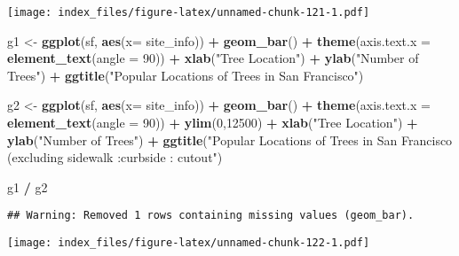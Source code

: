 \documentclass[
]{article}
\newenvironment{Shaded}{\begin{snugshade}}{\end{snugshade}}
\newcommand{\DataTypeTok}[1]{\textcolor[rgb]{0.13,0.29,0.53}{#1}}
\newcommand{\DecValTok}[1]{\textcolor[rgb]{0.00,0.00,0.81}{#1}}
\newcommand{\KeywordTok}[1]{\textcolor[rgb]{0.13,0.29,0.53}{\textbf{#1}}}
\newcommand{\NormalTok}[1]{#1}
\newcommand{\OperatorTok}[1]{\textcolor[rgb]{0.81,0.36,0.00}{\textbf{#1}}}
\newcommand{\StringTok}[1]{\textcolor[rgb]{0.31,0.60,0.02}{#1}}
\begin{document}
\texttt{[image: index\_files/figure-latex/unnamed-chunk-121-1.pdf]}

\begin{Shaded}
\begin{Highlighting}[]
\NormalTok{g1 <-}\StringTok{ }\KeywordTok{ggplot}\NormalTok{(sf, }\KeywordTok{aes}\NormalTok{(}\DataTypeTok{x=}\NormalTok{ site_info)) }\OperatorTok{+}
\StringTok{  }\KeywordTok{geom_bar}\NormalTok{() }\OperatorTok{+}
\StringTok{  }\KeywordTok{theme}\NormalTok{(}\DataTypeTok{axis.text.x =} \KeywordTok{element_text}\NormalTok{(}\DataTypeTok{angle =} \DecValTok{90}\NormalTok{)) }\OperatorTok{+}
\StringTok{  }\KeywordTok{xlab}\NormalTok{(}\StringTok{"Tree Location"}\NormalTok{) }\OperatorTok{+}
\StringTok{  }\KeywordTok{ylab}\NormalTok{(}\StringTok{"Number of Trees"}\NormalTok{) }\OperatorTok{+}
\StringTok{  }\KeywordTok{ggtitle}\NormalTok{(}\StringTok{"Popular Locations of Trees in San Francisco"}\NormalTok{)}

\NormalTok{g2 <-}\StringTok{ }\KeywordTok{ggplot}\NormalTok{(sf, }\KeywordTok{aes}\NormalTok{(}\DataTypeTok{x=}\NormalTok{ site_info)) }\OperatorTok{+}
\StringTok{  }\KeywordTok{geom_bar}\NormalTok{() }\OperatorTok{+}
\StringTok{  }\KeywordTok{theme}\NormalTok{(}\DataTypeTok{axis.text.x =} \KeywordTok{element_text}\NormalTok{(}\DataTypeTok{angle =} \DecValTok{90}\NormalTok{)) }\OperatorTok{+}\StringTok{ }
\StringTok{  }\KeywordTok{ylim}\NormalTok{(}\DecValTok{0}\NormalTok{,}\DecValTok{12500}\NormalTok{) }\OperatorTok{+}
\StringTok{  }\KeywordTok{xlab}\NormalTok{(}\StringTok{"Tree Location"}\NormalTok{) }\OperatorTok{+}
\StringTok{  }\KeywordTok{ylab}\NormalTok{(}\StringTok{"Number of Trees"}\NormalTok{) }\OperatorTok{+}
\StringTok{  }\KeywordTok{ggtitle}\NormalTok{(}\StringTok{"Popular Locations of Trees in San Francisco (excluding sidewalk :curbside : cutout"}\NormalTok{)}

\NormalTok{g1 }\OperatorTok{/}
\StringTok{  }\NormalTok{g2}
\end{Highlighting}
\end{Shaded}

\begin{verbatim}
## Warning: Removed 1 rows containing missing values (geom_bar).
\end{verbatim}

\texttt{[image: index\_files/figure-latex/unnamed-chunk-122-1.pdf]}
\end{document}
